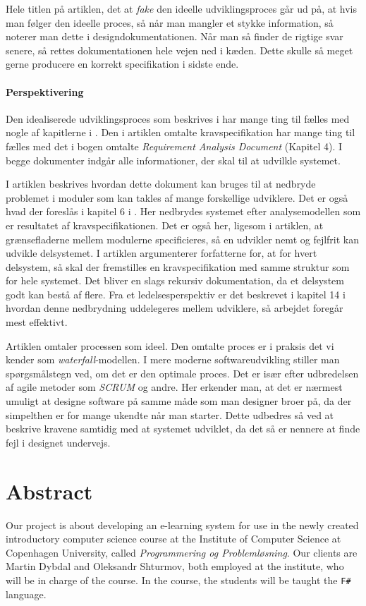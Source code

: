 \documentclass[12pt]{article}
\begin{document}
Hele titlen på artiklen, det at \emph{fake} den ideelle udviklingsproces går ud på, at hvis man følger den ideelle proces, så når man mangler et stykke information, så noterer man dette i designdokumentationen. Når man så finder de rigtige svar senere, så rettes dokumentationen hele vejen ned i kæden. Dette skulle så meget gerne producere en korrekt specifikation i sidste ende.

\paragraph{Perspektivering}
Den idealiserede udviklingsproces som beskrives i \cite{parnas1986rational} har mange ting til fælles med nogle af kapitlerne i \cite{OOSE}. Den i artiklen omtalte kravspecifikation har mange ting til fælles med det i bogen omtalte \emph{Requirement Analysis Document} (Kapitel 4). I begge dokumenter indgår alle informationer, der skal til at udvilkle systemet.

I artiklen beskrives hvordan dette dokument kan bruges til at nedbryde problemet i moduler som kan takles af mange forskellige udviklere. Det er også hvad der foreslås i kapitel 6 i \cite{OOSE}. Her nedbrydes systemet efter analysemodellen som er resultatet af kravspecifikationen. Det er også her, ligesom i artiklen, at grænsefladerne mellem modulerne specificieres, så en udvikler nemt og fejlfrit kan udvikle delsystemet. I artiklen argumenterer forfatterne for, at for hvert delsystem, så skal der fremstilles en kravspecifikation med samme struktur som for hele systemet. Det bliver en slags rekursiv dokumentation, da et delsystem godt kan bestå af flere. Fra et ledelsesperspektiv er det beskrevet i kapitel 14 i \cite{OOSE} hvordan denne nedbrydning uddelegeres mellem udviklere, så arbejdet foregår mest effektivt.

Artiklen omtaler processen som ideel. Den omtalte proces er i praksis det vi kender som \emph{waterfall}-modellen. I mere moderne softwareudvikling stiller man spørgsmålstegn ved, om det er den optimale proces. Det er især efter udbredelsen af agile metoder som \emph{SCRUM} \cite{sutherland2010jeff} og andre. Her erkender man, at det er nærmest umuligt at designe software på samme måde som man designer broer på, da der simpelthen er for mange ukendte når man starter. Dette udbedres så ved at beskrive kravene samtidig med at systemet udviklet, da det så er nennere at finde fejl i designet undervejs.

\newpage
\section{Abstract}
\label{sec:abstract}
Our project is about developing an e-learning system for use in the newly created introductory computer science course at the Institute of Computer Science at Copenhagen University, called \emph{Programmering og Problemløsning}. Our clients are Martin Dybdal and Oleksandr Shturmov, both employed at the institute, who will be in charge of the course. In the course, the students will be taught the \verb!F#! language.
\end{document}

